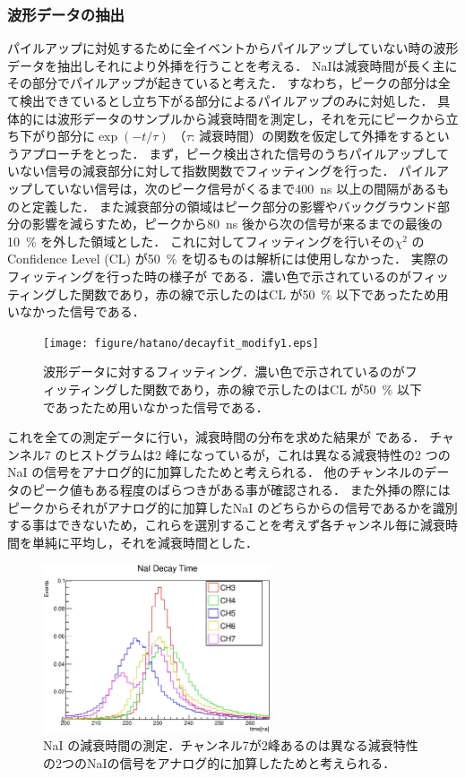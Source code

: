 \subsubsection{波形データの抽出}
パイルアップに対処するために全イベントからパイルアップしていない時の波形データを抽出しそれにより外挿を行うことを考える．
NaIは減衰時間が長く主にその部分でパイルアップが起きていると考えた．
すなわち，ピークの部分は全て検出できているとし立ち下がる部分によるパイルアップのみに対処した．
具体的には波形データのサンプルから減衰時間を測定し，それを元にピークから立ち下がり部分に$\exp(-t/\tau)$ （$\tau$: 減衰時間）の関数を仮定して外挿をするというアプローチをとった．
まず，ピーク検出された信号のうちパイルアップしていない信号の減衰部分に対して指数関数でフィッティングを行った．
パイルアップしていない信号は，次のピーク信号がくるまで400~ns 以上の間隔があるものと定義した．
また減衰部分の領域はピーク部分の影響やバックグラウンド部分の影響を減らすため，ピークから80~ns 後から次の信号が来るまでの最後の10~\% を外した領域とした．
これに対してフィッティングを行いその$\chi^2$ のConfidence Level (CL) が50~\% を切るものは解析には使用しなかった．
実際のフィッティングを行った時の様子が である．濃い色で示されているのがフィッティングした関数であり，赤の線で示したのはCL が50~\% 以下であったため用いなかった信号である．

\begin{figure}[hbt]
\centering
\texttt{[image: figure/hatano/decayfit\_modify1.eps]}
\caption{波形データに対するフィッティング．濃い色で示されているのがフィッティングした関数であり，赤の線で示したのはCL が50~\% 以下であったため用いなかった信号である．}
\label{hatano_fig:decayfit}
\end{figure}

これを全ての測定データに行い，減衰時間の分布を求めた結果が である．
チャンネル7 のヒストグラムは2 峰になっているが，これは異なる減衰特性の2 つのNaI の信号をアナログ的に加算したためと考えられる．
他のチャンネルのデータのピーク値もある程度のばらつきがある事が確認される．
また外挿の際にはピークからそれがアナログ的に加算したNaI のどちらからの信号であるかを識別する事はできないため，これらを選別することを考えず各チャンネル毎に減衰時間を単純に平均し，それを減衰時間とした．

\begin{figure}[hbt]
\centering
\includegraphics[width=0.6\textwidth]{figure/hatano/decaytime.eps}
\caption{NaI の減衰時間の測定．チャンネル7が2峰あるのは異なる減衰特性の2つのNaIの信号をアナログ的に加算したためと考えられる．}
\label{hatano_fig:decaytime}
\end{figure}

